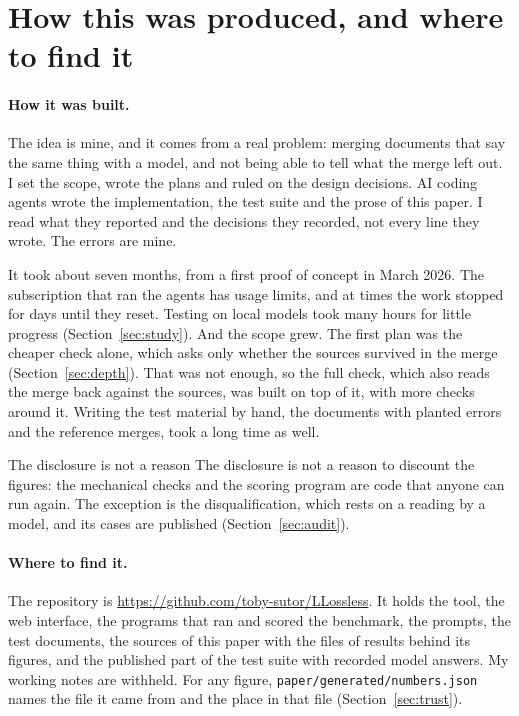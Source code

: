 \section{How this was produced, and where to find it}
\label{sec:availability}

\paragraph{How it was built.} The idea is mine, and it comes from a real problem: merging documents that say the same thing with a model, and not being able to tell what the merge left out. I set the scope, wrote the plans and ruled on the design decisions. AI coding agents wrote the implementation, the test suite and the prose of this paper. I read what they reported and the decisions they recorded, not every line they wrote. The errors are mine.

It took about seven months, from a first proof of concept in March 2026. The subscription that ran the agents has usage limits, and at times the work stopped for days until they reset. Testing on local models took many hours for little progress (Section~\ref{sec:study}). And the scope grew. The first plan was the cheaper check alone, which asks only whether the sources survived in the merge (Section~\ref{sec:depth}). That was not enough, so the full check, which also reads the merge back against the sources, was built on top of it, with more checks around it. Writing the test material by hand, the documents with planted errors and the reference merges, took a long time as well.

The disclosure is not a reason The disclosure is not a reason to discount the figures: the mechanical checks and the scoring program are code that anyone can run again. The exception is the disqualification, which rests on a reading by a model, and its cases are published (Section~\ref{sec:audit}).

\paragraph{Where to find it.} The repository is \url{https://github.com/toby-sutor/LLossless}. It holds the tool, the web interface, the programs that ran and scored the benchmark, the prompts, the test documents, the sources of this paper with the files of results behind its figures, and the published part of the test suite with recorded model answers. My working notes are withheld. For any figure, \texttt{paper/generated/numbers.json} names the file it came from and the place in that file (Section~\ref{sec:trust}).

